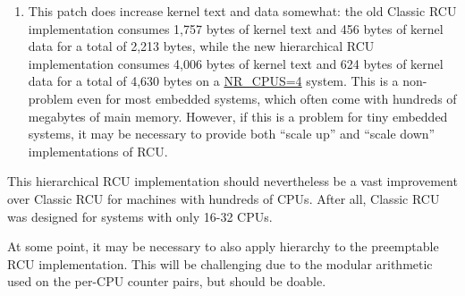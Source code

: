 \begin{enumerate}
\item	This patch does increase kernel text and data somewhat:
	the old Classic RCU implementation consumes 1,757 bytes of
	kernel text and 456 bytes of kernel data for a total of 2,213 bytes,
	while the new hierarchical RCU implementation consumes 4,006
	bytes of kernel text and 624 bytes of kernel data for a total
	of 4,630 bytes on a \url{NR_CPUS=4} system.
	This is a non-problem even for most embedded systems, which
	often come with hundreds of megabytes of main memory.
	However, if this is a problem for tiny embedded systems, it may
	be necessary to provide both ``scale up'' and
	``scale down'' implementations of RCU.
\end{enumerate}

This hierarchical RCU implementation should nevertheless be a vast
improvement over Classic RCU for machines with hundreds of CPUs.
After all, Classic RCU was designed for systems with only 16-32 CPUs.

At some point, it may be necessary to also apply hierarchy to the
preemptable RCU implementation.
This will be challenging due to the modular arithmetic used on the
per-CPU counter pairs, but should be doable.
